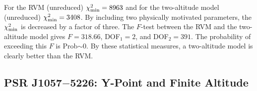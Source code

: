 For the RVM (unreduced) $\chi^2_{\rm{min}}=8963$ 
and for the two-altitude model (unreduced) $\chi^2_{\rm{min}}=3408$. By including two physically motivated 
parameters, the $\chi^2_{\rm{min}}$ is decreased by a factor of three.  
The $F$-test between the RVM and the two-altitude model gives $F=318.66$, DOF$_1=2$, and DOF$_2=391$. The probability of
exceeding this $F$ is Prob$\sim 0$.  By these statistical measures, a two-altitude model is clearly
better than the RVM.



\subsection{PSR J1057$-$5226: Y-Point and Finite Altitude}
\label{sec:J1057}

\begin{table}[t!!]
\small
\tabcolsep=0.05cm
\caption{Fit Parameters for PSR J1057$-$5226} 
\begin{center}
\def\arraystretch{2}
\label{tb:fitJ1057}
\end{center} 
\end{table}



